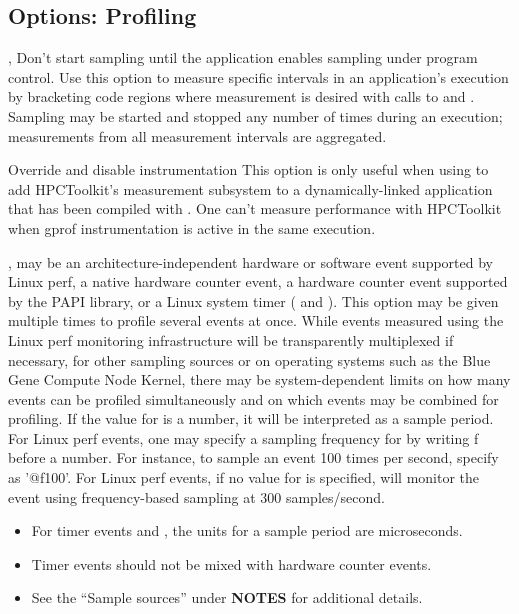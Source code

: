 \documentclass[english]{article}
\begin{document}
\subsection{Options: Profiling}

\begin{Description}

\item[\Opt{-ds}, \Opt{--delay-sampling}]
Don't start sampling until the application enables sampling under program control. 
Use this option to measure specific intervals in an application's execution by bracketing code 
regions where measurement is desired 
with calls to  and .
Sampling may be started and stopped any number of times during an execution;
measurements from all measurement intervals are aggregated.

\item[\Opt{--disable-gprof}]
Override and disable  instrumentation  This option
is only useful when using  to add HPCToolkit's
measurement subsystem to a dynamically-linked application
that has been compiled with . One can't measure
performance with HPCToolkit when gprof instrumentation
is active in the same execution.

\item[\OptArg{-e}{event\Lbr@howoften\Rbr}, \OptArg{--event}{event\Lbr@howoften\Rbr}]
 may be an architecture-independent hardware or software event supported by Linux perf, a native hardware counter event, 
a hardware counter event supported by the PAPI library, or a Linux system timer ( and ).
This option may be given multiple times to profile several events at once. 
While events measured using the Linux perf monitoring infrastructure will be transparently multiplexed if necessary, 
for other sampling sources or on operating systems such as the Blue Gene Compute Node Kernel,
there may be system-dependent limits on how many events can be profiled simultaneously and on which events may be combined for profiling.
If the value for  is a number, it will be interpreted as a sample period.
For Linux perf events, one may specify a sampling frequency for  by writing f before a number.  
For instance, to sample an event 100 times per second, specify  as '@f100'.
For Linux perf events, if no value for  is specified,  will monitor the event using frequency-based sampling at 300 samples/second.
\begin{itemize}
  \item For timer events  and , the units for a sample period are microseconds.
  \item Timer events should not be mixed with hardware counter events.
  \item See the ``Sample sources'' under \textbf{NOTES} for additional details.
\end{itemize}


\end{Description}
\end{document}
